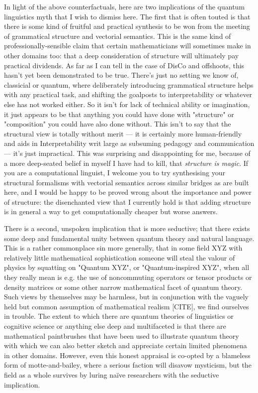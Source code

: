 In light of the above counterfactuals, here are two implications of the quantum linguistics myth that I wish to dismiss here. The first that is often touted is that there is some kind of fruitful and practical synthesis to be won from the meeting of grammatical structure and vectorial semantics. This is the same kind of professionally-sensible claim that certain mathematicians will sometimes make in other domains too: that a deep consideration of structure will ultimately pay practical dividends. As far as I can tell in the case of DisCo and offshoots, this hasn't yet been demonstrated to be true. There's just no setting we know of, classicial or quantum, where deliberately introducing grammatical structure helps with any practical task, and shifting the goalposts to interpretability or whatever else has not worked either. So it isn't for lack of technical ability or imagination, it just appears to be that anything you could have done with "structure" or "composition" you could have also done without. This isn't to say that the structural view is totally without merit --- it is certainly more human-friendly and aids in Interpretability writ large as subsuming pedagogy and communication --- it's just impractical. This was surprising and disappointing for me, because of a more deep-seated belief in myself I have had to kill, that \emph{structure is magic}. If you are a computational linguist, I welcome you to try synthesising your structural formalisms with vectorial semantics across similar bridges as are built here, and I would be happy to be proved wrong about the importance and power of structure: the disenchanted view that I currently hold is that adding structure is in general a way to get computationally cheaper but worse answers.

There is a second, unspoken implication that is more seductive; that there exists some deep and fundamental unity between quantum theory and natural language. This is a rather commonplace sin more generally, that in some field XYZ with relatively little mathematical sophistication someone will steal the valour of physics by squatting on "Quantum XYZ", or "Quantum-inspired XYZ", when all they really mean is e.g. the use of noncommuting operators or tensor products or density matrices or some other narrow mathematical facet of quantum theory. Such views by themselves may be harmless, but in conjunction with the vaguely held but common assumption of mathematical realism [CITE], we find ourselves in trouble. The extent to which there are quantum theories of linguistics or cognitive science or anything else deep and multifaceted is that there are mathematical paintbrushes that have been used to illustrate quantum theory with which we can also better sketch and appreciate certain limited phenomena in other domains. However, even this honest appraisal is co-opted by a blameless form of motte-and-bailey, where a serious faction will disavow mysticism, but the field as a whole survives by luring na\"{i}ve researchers with the seductive implication.

